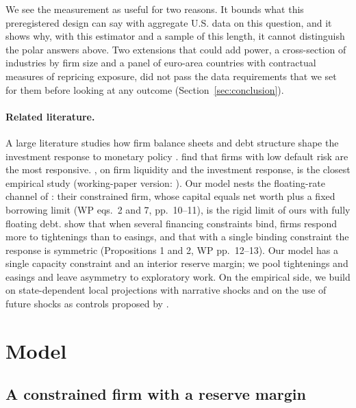 \documentclass[11pt]{article}
\theoremstyle{remark}
\begin{document}
We see the measurement as useful for two reasons. It bounds what this preregistered design can say with aggregate U.S. data on this
question, and it shows why, with this estimator and a sample of this length, it cannot distinguish the polar answers above. Two extensions that could
add power, a cross-section of industries by firm size and a panel of euro-area countries with contractual measures of
repricing exposure, did not pass the data requirements that we set for them before looking at any outcome
(Section~\ref{sec:conclusion}).

\paragraph{Related literature.}
A large literature studies how firm balance sheets and debt structure shape the investment response to monetary policy
\citep{OttonelloWinberry2020,CloyneFerreiraFroemelSurico2023,GrobZullig2024,JungherrMeierReineltSchott2024,GreenwaldKrainerPaul2025,BotteroEtAl2026}.
\citet{OttonelloWinberry2020} find that firms with low default risk are the most responsive. \citet{JeenasJPE2026}, on firm
liquidity and the investment response, is the closest empirical study (working-paper version: \citealt{Jeenas2026}). Our model nests the floating-rate channel of
\citet{IppolitoOzdagliPerezOrive2018}: their constrained firm, whose capital equals net worth plus a fixed borrowing limit
(WP eqs.~2 and 7, pp.~10--11), is the rigid limit of ours with fully floating debt. \citet{PerezOriveTimmerVanDerGhote2026}
show that when several financing constraints bind, firms respond more to tightenings than to easings, and that with a single
binding constraint the response is symmetric (Propositions 1 and 2, WP pp.~12--13). Our model has a single capacity
constraint and an interior reserve margin; we pool tightenings and easings and leave asymmetry to exploratory work. On the
empirical side, we build on state-dependent local projections with narrative shocks \citep{TenreyroThwaites2016,Ramey2016}
and on the use of future shocks as controls proposed by \citet{TeulingsZubanov2014}.

\section{Model}\label{sec:model}

\subsection{A constrained firm with a reserve margin}
\end{document}
